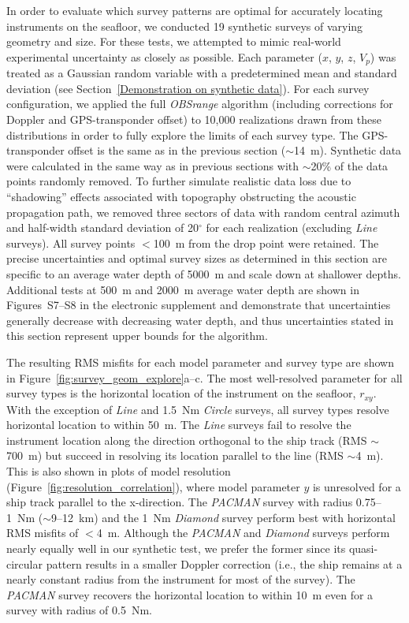 \documentclass[10pt,titlepage]{article}
\begin{document}
In order to evaluate which survey patterns are optimal for accurately locating instruments on the seafloor, we conducted 19 synthetic surveys of varying geometry and size. For these tests, we attempted to mimic real-world experimental uncertainty as closely as possible. Each parameter ($x$, $y$, $z$, $V_p$) was treated as a Gaussian random variable with a predetermined mean and standard deviation
(see Section~\ref{Demonstration on synthetic data}). For each survey configuration, we applied the full \textit{OBSrange} algorithm (including corrections for Doppler and GPS-transponder offset) to 10,000 realizations drawn from these distributions in order to fully explore the limits of each survey type. The GPS-transponder offset is the same as in the previous section ($\sim$14~m). Synthetic data were calculated in the same way as in previous sections with $\sim$20\% of the data points randomly removed. To further simulate realistic data loss due to ``shadowing'' effects associated with topography obstructing the acoustic propagation path, we removed three sectors of data with random central azimuth and half-width standard deviation of 20$^{\circ}$ for each realization (excluding \textit{Line} surveys). All survey points $<$100~m from the drop point were retained. The precise uncertainties and optimal survey sizes as determined in this section are specific to an average water depth of 5000~m and scale down at shallower depths. Additional tests at 500~m and 2000~m average water depth are shown in Figures~S7--S8 in the electronic supplement and demonstrate that uncertainties generally decrease with decreasing water depth, and thus uncertainties stated in this section represent upper bounds for the algorithm.

The resulting RMS misfits for each model parameter and survey type are shown in Figure~\ref{fig:survey_geom_explore}a--c. The most well-resolved parameter for all survey types is the horizontal location of the instrument on the seafloor, $r_{xy}$. With the exception of \textit{Line} and 1.5~Nm \textit{Circle} surveys, all survey types resolve horizontal location to within 50~m. The \textit{Line} surveys fail to resolve the instrument location along the direction orthogonal to the ship track (RMS $\sim$700~m) but succeed in resolving its location parallel to the line (RMS $\sim$4~m). This is also shown in plots of model resolution (Figure~\ref{fig:resolution_correlation}), where model parameter $y$ is unresolved for a ship track parallel to the x-direction. The \textit{PACMAN} survey with radius 0.75--1~Nm ($\sim$9--12~km) and the 1~Nm \textit{Diamond} survey perform best with horizontal RMS misfits of $<$4~m. Although the \textit{PACMAN} and \textit{Diamond} surveys perform nearly equally well in our synthetic test, we prefer the former since its quasi-circular pattern results in a smaller Doppler correction (i.e., the ship remains at a nearly constant radius from the instrument for most of the survey). The \textit{PACMAN} survey recovers the horizontal location to within 10~m even for a survey with radius of 0.5~Nm.
\end{document}
